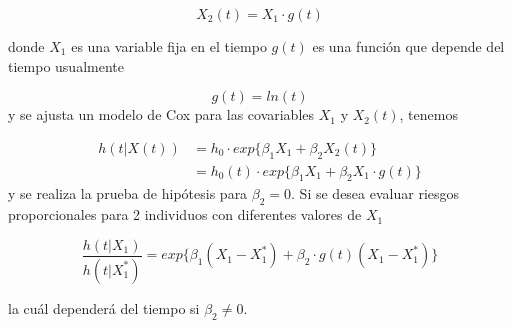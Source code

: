 \documentclass[
  a4paper,
  oneside,
  openany]{book}
\begin{document}
\[
X_2(t)= X_1 \cdot g(t) 
\]

donde \(X_1\) es una variable fija en el tiempo \(g(t)\) es una función que depende del tiempo usualmente

\[
g(t)= ln (t ) 
\]
y se ajusta un modelo de Cox para las covariables \(X_1\) y \(X_2(t)\), tenemos

\[  
\begin{split}
h(t|X(t)) &= h_0 \cdot exp \{ \beta_1 X_1 +\beta_2X_2(t) \}\\
&=h_0(t) \cdot exp \{ \beta_1 X_1+\beta_2 X_1\cdot g(t) \}
\end{split}
\]
y se realiza la prueba de hipótesis para \(\beta_2=0\). Si se desea evaluar riesgos proporcionales para 2 individuos con diferentes valores de \(X_1\)

\[
\frac{h(t|X_1)}{h(t|X_1^*)}= exp \{ \beta_1 (X_1-X_1^*)+\beta_2\cdot g(t)(X_1-X_1^*) \}
\]

la cuál dependerá del tiempo si \(\beta_2 \ne 0\).

  
\end{document}
